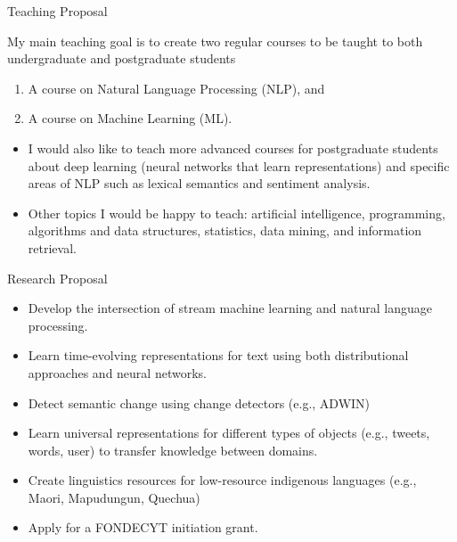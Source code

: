 \documentclass[handout]{beamer}
\begin{document}
\begin{frame}{Teaching Proposal}
\begin{scriptsize}
My main teaching goal is to create two regular courses to be taught to both undergraduate and postgraduate students
\begin{enumerate}
 \item A course on Natural Language Processing (NLP), and
 \item A course  on Machine Learning (ML). 
  \end{enumerate} 


\begin{itemize}
 \item I would also like to teach more advanced courses for postgraduate students about deep learning (neural networks that learn representations) and specific areas of NLP such as lexical semantics and sentiment analysis.
 \item Other topics I would be happy to teach: artificial intelligence, programming, algorithms and data structures, statistics, data mining, and information retrieval.  
\end{itemize}

\end{scriptsize}

\end{frame}


\begin{frame}{Research Proposal}
\begin{scriptsize}

\begin{itemize}
 \item Develop the intersection of stream machine learning and natural language processing. 
 \item Learn time-evolving representations for text using both distributional approaches and neural networks.
 \item Detect semantic change using change detectors (e.g., ADWIN)
 \item Learn universal representations for different types of objects (e.g., tweets, words, user) to transfer knowledge between domains.
 \item Create linguistics resources for low-resource indigenous languages (e.g., Maori, Mapudungun, Quechua)
 \item Apply for a FONDECYT initiation grant. 
\end{itemize}
\end{scriptsize}

\end{frame}
\end{document}
